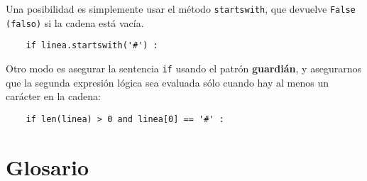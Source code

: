 Una posibilidad es simplemente usar el método {\tt startswith},
que devuelve {\tt False (falso)} si la cadena está vacía.

\beforeverb
\begin{verbatim}
    if linea.startswith('#') :
\end{verbatim}
\afterverb
%
Otro modo es asegurar la sentencia {\tt if} usando el patrón {\bf guardián},
y asegurarnos que la segunda expresión lógica sea evaluada
sólo cuando hay al menos un carácter en la cadena:

\beforeverb
\begin{verbatim}
    if len(linea) > 0 and linea[0] == '#' :
\end{verbatim}
\afterverb
%

\section{Glosario}

